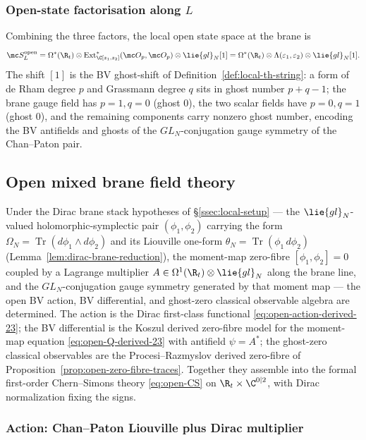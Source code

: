 \documentclass[11pt]{memoir}
\begin{document}
\subsubsection*{Open-state factorisation along \(L\)}

Combining the three factors, the local open state space at the brane
is
\[
  \mc S^{\mathrm{open}}_L
    =\Omega^*(\R_t)\otimes
      \operatorname{Ext}^*_{\C[z_1,z_2]}(\mc O_p,\mc O_p)\otimes
      \lie{gl}_N[1]
    =\Omega^*(\R_t)\otimes
      \Lambda(\varepsilon_1,\varepsilon_2)\otimes\lie{gl}_N[1].
\]
The shift \([1]\) is the BV ghost-shift of
Definition~\ref{def:local-th-string}: a form of de Rham degree \(p\)
and Grassmann degree \(q\) sits in ghost number \(p+q-1\); the brane
gauge field has \(p=1,q=0\) (ghost \(0\)), the two scalar fields have
\(p=0,q=1\) (ghost \(0\)), and the remaining components carry nonzero
ghost number, encoding the BV antifields and ghosts of the
\(GL_N\)-conjugation gauge symmetry of the Chan--Paton pair.

\subsection{Open mixed brane field theory}\label{ssec:open-mixed-bft}

Under the Dirac brane stack hypotheses of \S\ref{ssec:local-setup} ---
the \(\lie{gl}_N\)-valued holomorphic-symplectic pair
\((\phi_1,\phi_2)\) carrying the form
\(\Omega_N=\operatorname{Tr}(d\phi_1\wedge d\phi_2)\) and its
Liouville one-form
\(\theta_N=\operatorname{Tr}(\phi_1\,d\phi_2)\)
(Lemma~\ref{lem:dirac-brane-reduction}), the moment-map zero-fibre
\([\phi_1,\phi_2]=0\) coupled by a Lagrange multiplier
\(A\in\Omega^1(\R_t)\otimes\lie{gl}_N\) along the brane line, and the
\(GL_N\)-conjugation gauge symmetry generated by that moment map ---
the open BV action, BV differential, and ghost-zero classical
observable algebra are determined. The action is the Dirac first-class
functional \eqref{eq:open-action-derived-23}; the BV differential is
the Koszul derived zero-fibre model for the moment-map equation
\eqref{eq:open-Q-derived-23} with antifield \(\psi=A^*\); the ghost-zero
classical observables are the Procesi--Razmyslov derived zero-fibre of
Proposition~\ref{prop:open-zero-fibre-traces}.  Together they assemble
into the formal first-order Chern--Simons theory \eqref{eq:open-CS} on
\(\R_t\times\C^{0|2}\), with Dirac normalization fixing the signs.

\subsubsection*{Action: Chan--Paton Liouville plus Dirac multiplier}
\end{document}
